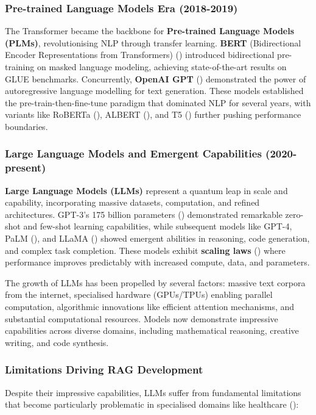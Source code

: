 \subsubsection{Pre-trained Language Models Era (2018-2019)}
The Transformer became the backbone for \textbf{Pre-trained Language Models (PLMs)}, revolutionising NLP through transfer learning. \textbf{BERT} (Bidirectional Encoder Representations from Transformers) (\citep{devlin2019bert}) introduced bidirectional pre-training on masked language modeling, achieving state-of-the-art results on GLUE benchmarks. Concurrently, \textbf{OpenAI GPT} (\citep{radford2019language}) demonstrated the power of autoregressive language modelling for text generation. These models established the pre-train-then-fine-tune paradigm that dominated NLP for several years, with variants like RoBERTa (\citep{liu2019roberta}), ALBERT (\citep{lan2020albert}), and T5 (\citep{raffel2020t5}) further pushing performance boundaries.

\subsubsection{Large Language Models and Emergent Capabilities (2020-present)}
\textbf{Large Language Models (LLMs)} represent a quantum leap in scale and capability, incorporating massive datasets, computation, and refined architectures. GPT-3's 175 billion parameters (\citep{brown2020language}) demonstrated remarkable zero-shot and few-shot learning capabilities, while subsequent models like GPT-4, PaLM (\citep{chowdhery2022palm}), and LLaMA (\citep{touvron2023llama}) showed emergent abilities in reasoning, code generation, and complex task completion. These models exhibit \textbf{scaling laws} (\citep{kaplan2020scaling}) where performance improves predictably with increased compute, data, and parameters.

The growth of LLMs has been propelled by several factors: massive text corpora from the internet, specialised hardware (GPUs/TPUs) enabling parallel computation, algorithmic innovations like efficient attention mechanisms, and substantial computational resources. Models now demonstrate impressive capabilities across diverse domains, including mathematical reasoning, creative writing, and code synthesis.

\subsubsection{Limitations Driving RAG Development}
Despite their impressive capabilities, LLMs suffer from fundamental limitations that become particularly problematic in specialised domains like healthcare (\citep{ji2023survey}):

